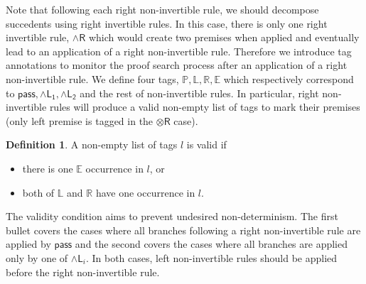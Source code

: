 \documentclass[submission,copyright,creativecommons]{eptcs}
\theoremstyle{definition}
\newtheorem{defn}{Definition}[section]
\newcommand{\tr}{\otimes \mathsf{R}}
\newcommand{\pass}{\mathsf{pass}}
\newcommand{\unitr}{\mathsf{IR}}
\newcommand{\andlone}{\land \mathsf{L_{1}}}
\newcommand{\andltwo}{\land \mathsf{L_{2}}}
\newcommand{\andli}{\land \mathsf{L}_{i}}
\newcommand{\andr}{\land \mathsf{R}}
\newcommand{\ax}{\mathsf{ax}}
\newcommand{\tP}{\mathbb{P}}
\newcommand{\tL}{\mathbb{L}}
\newcommand{\tR}{\mathbb{R}}
\newcommand{\tE}{\mathbb{E}}
\begin{document}
Note that following each right non-invertible rule, we should decompose succedents using right invertible rules.
In this case, there is only one right invertible rule, $\andr$ which would create two premises when applied and eventually lead to an application of a right non-invertible rule.
Therefore we introduce tag annotations to monitor the proof search process after an application of a right non-invertible rule.
We define four tags, $\tP , \tL , \tR , \tE$ which respectively correspond to $\pass , \andlone , \andltwo$ and the rest of non-invertible rules.
In particular, right non-invertible rules will produce a valid non-empty list of tags to mark their premises (only left premise is tagged in the $\tr$ case).
\begin{defn}\label{tag:validity}
  A non-empty list of tags $l$ is valid if 
  \begin{itemize}
    \item there is one $\tE$ occurrence in $l$, or
    \item both of $\tL$ and $\tR$ have one occurrence in $l$.
  \end{itemize}
\end{defn}
The validity condition aims to prevent undesired non-determinism.
The first bullet covers the cases where all branches following a right non-invertible rule are applied by $\pass$ and the second covers the cases where all branches are applied only by one of $\andli$.
In both cases, left non-invertible rules should be applied before the right non-invertible rule.
\end{document}
